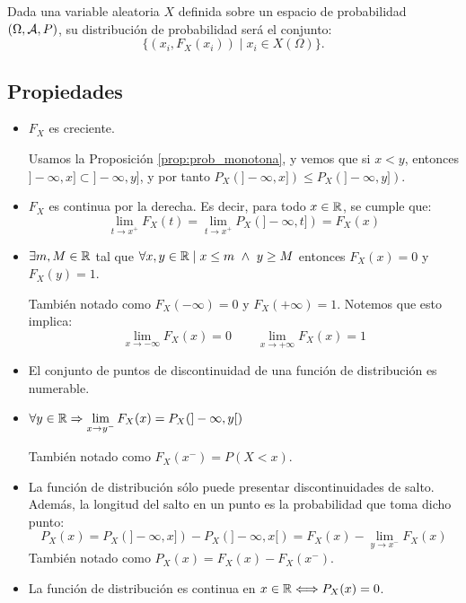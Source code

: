 \begin{definicion}
    Dada una variable aleatoria $X$ definida sobre un espacio de probabilidad $(\Omega, \mathcal{A}, P)$, su distribución de probabilidad será el conjunto:
    \begin{equation*}
        \{(x_i, F_X(x_i)) \mid x_i\in X(\Omega)\}.
    \end{equation*}
\end{definicion}

\subsection{Propiedades}
\begin{itemize}
\item $F_X$ es creciente.

Usamos la Proposición \ref{prop:prob_monotona}, y vemos que si $x < y$, entonces $]-\infty, x] \subset ]-\infty, y]$, y por tanto $P_X(]-\infty, x]) \leq P_X(]-\infty, y])$.

\item $F_X$ es continua por la derecha. Es decir, para todo $x \in \mathbb R$, se cumple que:
\begin{equation*}
    \lim_{t \to x^{+}} F_X(t) =
    \lim_{t \to x^{+}} P_X(]-\infty, t]) =
    F_X(x)
\end{equation*}

\item $\exists m,M \in \mathbb R$ tal que $\forall x,y \in \mathbb R \mid x \leq m \ \land \ y \geq M$ entonces $F_X(x)=0$
        y $F_X(y)=1$.\par
      También notado como $F_X(-\infty)=0$ y $F_X(+\infty)=1$. Notemos que esto implica:
      \begin{equation*}
            \lim_{x \to -\infty} F_X(x) = 0 \qquad \lim_{x \to +\infty} F_X(x) = 1
      \end{equation*}

\item El conjunto de puntos de discontinuidad de una función de distribución es numerable.

\item $\forall y \in \mathbb R \Rightarrow \lim\limits_{x \to y^{-}} F_X(x) = P_X(]-\infty, y[)$

      También notado como $F_X(x^{-})=P(X<x)$.
\item La función de distribución sólo puede presentar discontinuidades de salto. Además, la longitud del salto
      en un punto es la probabilidad que toma dicho punto:
      $$P_X(x) = P_X(]-\infty, x]) - P_X(]-\infty, x[) = F_X(x) - \lim\limits_{y \to x^{-}}F_X(x)$$
      También notado como $P_X(x) = F_X(x) - F_X(x^{-})$.
\item La función de distribución es continua en $x \in \mathbb R \Longleftrightarrow P_X(x) = 0$.
\end{itemize}

